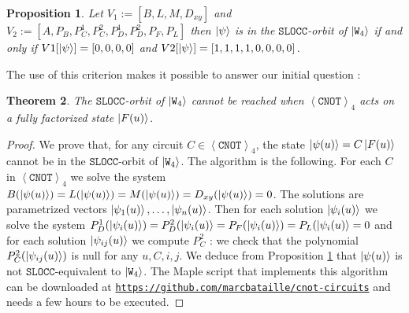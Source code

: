 \documentclass[a4paper,12pt,fleqn]{article}
\newcommand\SLOCC{\mathtt{SLOCC}}
\newcommand\W{\mathtt{W}}
\newcommand\cnot{\mathtt{CNOT}}
\newcommand\XG[1][n]{\left<\cnot\right>_{#1}}
\newtheorem{theo}{Theorem}
\newtheorem{prop}[theo]{Proposition}
\begin{document}
    \begin{prop}\label{W4criterion}
Let $V_1:=[B,L,M,D_{xy}]$ and $V_2:=[A, P_B ,P_C^1 ,P_C^2 ,P_D^1,P_D^2,P_F,P_L]$ then $\ket{\psi}$ is in the $\SLOCC$-orbit of $\ket{\W_4}$ if and only if  $V1[\ket{\psi}]=[0,0,0,0]$
    and $V2[\ket{\psi}]=[1,1,1,1,0,0,0,0]$. 
      \end{prop}
The use of this criterion makes it possible to answer our initial question :
      
    

    \begin{theo} The $\SLOCC$-orbit of $\ket{\W_4}$ cannot be reached when $\XG[4]$ acts on a fully factorized state $\ket{F(u)}$.
    \end{theo}
    \begin{proof}
      We prove that, for any circuit $C\in\XG[4]$, the state $\ket{\psi(u)}=C\ket{F(u)}$ cannot be in the $\SLOCC$-orbit of $\ket{\W_4}$. The algorithm is the following.
      For each $C$ in $\XG[4]$ we solve the system $B(\ket{\psi(u)})=L(\ket{\psi(u)})=M(\ket{\psi(u)})=D_{xy}(\ket{\psi(u)})=0$. The solutions are parametrized vectors $\ket{\psi_1(u)},\dots,\ket{\psi_n(u)}$. Then for each solution $\ket{\psi_i(u)}$ we solve the system $P_D^1(\ket{\psi_i(u)})=P_D^2(\ket{\psi_i(u)}=P_F(\ket{\psi_i(u)})=P_L(\ket{\psi_i(u)}=0$ and
      for each solution $\ket{\psi_{ij}(u)}$ we compute $P_C^2$ : we check that the polynomial $P_C^2(\ket{\psi_{ij}(u)})$ is null for any $u,C,i,j$.
      We deduce from Proposition \ref{W4criterion} that $\ket{\psi(u)}$ is not $\SLOCC$-equivalent to $\ket{\W_4}$.
      The Maple script that implements this algorithm can be downloaded at
      \href{https://github.com/marcbataille/cnot-circuits/blob/master/entanglement/findW4.mpl}{\texttt{https://github.com/marcbataille/cnot-circuits}} and needs a few hours to be executed.
      \end{proof}
    

    


      


  
\end{document}
